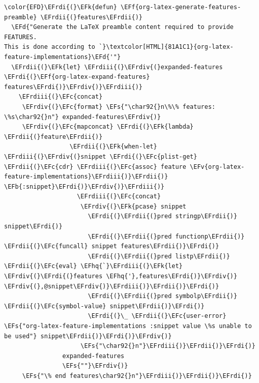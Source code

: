 \documentclass{scrartcl}
\newcommand{\EFk}[1]{\textcolor{EFk}{#1}} %
\newcommand{\EFd}[1]{\textcolor{EFd}{#1}} %
\newcommand{\EFs}[1]{\textcolor{EFs}{#1}} %
\newcommand{\EFb}[1]{\textcolor{EFb}{#1}} %
\newcommand{\EFc}[1]{\textcolor{EFc}{#1}} %
\newcommand{\EFv}[1]{\textcolor{EFv}{#1}} %
\newcommand{\EFf}[1]{\textcolor{EFf}{#1}} %
\newcommand{\EFhq}[1]{#1} %
\newcommand{\EFrdi}[1]{#1} %
\newcommand{\EFrdii}[1]{#1} %
\newcommand{\EFrdiii}[1]{#1} %
\newcommand{\EFrdiv}[1]{#1} %
\begin{document}
\begin{Code}
\begin{Verbatim}[]
\color{EFD}\EFrdi{(}\EFk{defun} \EFf{org-latex-generate-features-preamble} \EFrdii{(}features\EFrdii{)}
  \EFd{"Generate the LaTeX preamble content required to provide FEATURES.
This is done according to `}\textcolor[HTML]{81A1C1}{org-latex-feature-implementations}\EFd{'"}
  \EFrdii{(}\EFk{let} \EFrdiii{(}\EFrdiv{(}expanded-features \EFrdi{(}\EFf{org-latex-expand-features} features\EFrdi{)}\EFrdiv{)}\EFrdiii{)}
    \EFrdiii{(}\EFc{concat}
     \EFrdiv{(}\EFc{format} \EFs{"\char92{}n\%\% features: \%s\char92{}n"} expanded-features\EFrdiv{)}
     \EFrdiv{(}\EFc{mapconcat} \EFrdi{(}\EFk{lambda} \EFrdii{(}feature\EFrdii{)}
                  \EFrdii{(}\EFk{when-let} \EFrdiii{(}\EFrdiv{(}snippet \EFrdi{(}\EFc{plist-get} \EFrdii{(}\EFc{cdr} \EFrdiii{(}\EFc{assoc} feature \EFv{org-latex-feature-implementations}\EFrdiii{)}\EFrdii{)} \EFb{:snippet}\EFrdi{)}\EFrdiv{)}\EFrdiii{)}
                    \EFrdiii{(}\EFc{concat}
                     \EFrdiv{(}\EFk{pcase} snippet
                       \EFrdi{(}\EFrdii{(}pred stringp\EFrdii{)} snippet\EFrdi{)}
                       \EFrdi{(}\EFrdii{(}pred functionp\EFrdii{)} \EFrdii{(}\EFc{funcall} snippet features\EFrdii{)}\EFrdi{)}
                       \EFrdi{(}\EFrdii{(}pred listp\EFrdii{)} \EFrdii{(}\EFc{eval} \EFhq{`}\EFrdiii{(}\EFk{let} \EFrdiv{(}\EFrdi{(}features \EFhq{'},features\EFrdi{)}\EFrdiv{)} \EFrdiv{(},@snippet\EFrdiv{)}\EFrdiii{)}\EFrdii{)}\EFrdi{)}
                       \EFrdi{(}\EFrdii{(}pred symbolp\EFrdii{)} \EFrdii{(}\EFc{symbol-value} snippet\EFrdii{)}\EFrdi{)}
                       \EFrdi{(}\_ \EFrdii{(}\EFc{user-error} \EFs{"org-latex-feature-implementations :snippet value \%s unable to be used"} snippet\EFrdii{)}\EFrdi{)}\EFrdiv{)}
                     \EFs{"\char92{}n"}\EFrdiii{)}\EFrdii{)}\EFrdi{)}
                expanded-features
                \EFs{""}\EFrdiv{)}
     \EFs{"\% end features\char92{}n"}\EFrdiii{)}\EFrdii{)}\EFrdi{)}
\end{Verbatim}
\end{Code}
\end{document}
